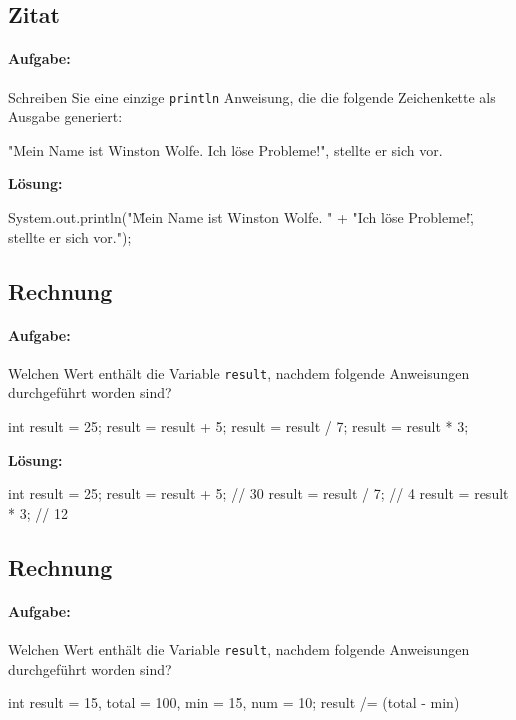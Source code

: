 \documentclass[a4paper,10pt, dvipsnames]{report}
\begin{document}
\subsection{Zitat}

\paragraph{Aufgabe:}
Schreiben Sie eine einzige \texttt{println} Anweisung, die die folgende Zeichenkette als Ausgabe generiert:
\begin{textcodebox}
"Mein Name ist Winston Wolfe.
Ich löse Probleme!", stellte er sich vor.
\end{textcodebox}

\textbf{Lösung:}

\begin{javacodebox}
System.out.println("\"Mein Name ist Winston Wolfe. \n" +
    "Ich löse Probleme!\", stellte er sich vor.");
\end{javacodebox}

\subsection{Rechnung}

\paragraph{Aufgabe:}
Welchen Wert enthält die Variable \texttt{result}, nachdem folgende Anweisungen durchgeführt worden sind?
\begin{javacodebox}
int result = 25;
result = result + 5;
result = result / 7;
result = result * 3;    
\end{javacodebox}



\textbf{Lösung:}
\begin{javacodebox}
int result = 25;
result = result + 5; // 30
result = result / 7; // 4
result = result * 3; // 12
\end{javacodebox}

\subsection{Rechnung}

\paragraph{Aufgabe:}
Welchen Wert enthält die Variable \texttt{result}, nachdem folgende Anweisungen durchgeführt worden sind?
\begin{javacodebox}
int result = 15, total = 100, min = 15, num = 10;
result /= (total - min) %
\end{javacodebox}
\end{document}
